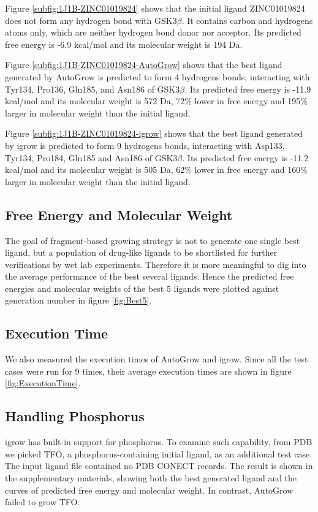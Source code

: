 \documentclass[10pt, conference, compsocconf]{../IEEEtran}
\begin{document}
Figure \ref{subfig:1J1B-ZINC01019824} shows that the initial ligand ZINC01019824 does not form any hydrogen bond with GSK3$\beta$. It contains carbon and hydrogens atoms only, which are neither hydrogen bond donor nor acceptor. Its predicted free energy is -6.9 kcal/mol and its molecular weight is 194 Da.

Figure \ref{subfig:1J1B-ZINC01019824-AutoGrow} shows that the best ligand generated by AutoGrow is predicted to form 4 hydrogens bonds, interacting with Tyr134, Pro136, Gln185, and Asn186 of GSK3$\beta$. Its predicted free energy is -11.9 kcal/mol and its molecular weight is 572 Da, 72\% lower in free energy and 195\% larger in molecular weight than the initial ligand.

Figure \ref{subfig:1J1B-ZINC01019824-igrow} shows that the best ligand generated by igrow is predicted to form 9 hydrogens bonds, interacting with Asp133, Tyr134, Pro184, Gln185 and Asn186 of GSK3$\beta$. Its predicted free energy is -11.2 kcal/mol and its molecular weight is 505 Da, 62\% lower in free energy and 160\% larger in molecular weight than the initial ligand.

\subsection{Free Energy and Molecular Weight}

The goal of fragment-based growing strategy is not to generate one single best ligand, but a population of drug-like ligands to be shortlisted for further verifications by wet lab experiments. Therefore it is more meaningful to dig into the average performance of the best several ligands. Hence the predicted free energies and molecular weights of the best 5 ligands were plotted against generation number in figure \ref{fig:Best5}.

\subsection{Execution Time}

We also measured the execution times of AutoGrow and igrow. Since all the test cases were run for 9 times, their average execution times are shown in figure \ref{fig:ExecutionTime}.

\subsection{Handling Phosphorus}

igrow has built-in support for phosphorus. To examine such capability, from PDB we picked TFO, a phosphorus-containing initial ligand, as an additional test case. The input ligand file contained no PDB CONECT records. The result is shown in the supplementary materials, showing both the best generated ligand and the curves of predicted free energy and molecular weight. In contrast, AutoGrow failed to grow TFO.
\end{document}
